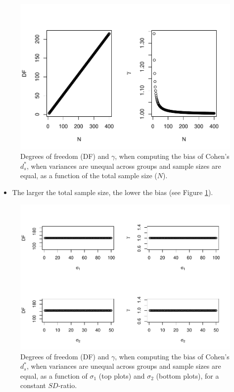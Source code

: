 \documentclass[
  english,
  man,mask]{apa6}
\providecommand{\tightlist}{%
  \setlength{\itemsep}{0pt}\setlength{\parskip}{0pt}}
\begin{document}
\begin{figure}
\centering
\includegraphics{Theoretical-Bias-of-all-estimators-as-a-function-of-population-parameters_files/figure-latex/biascohendprimehetbalNsize2-1.pdf}
\caption{\label{fig:biascohendprimehetbalNsize2}Degrees of freedom (DF) and \(\gamma\), when computing the bias of Cohen's \(d^*_s\), when variances are unequal across groups and sample sizes are equal, as a function of the total sample size (\(N\)).}
\end{figure}

\begin{itemize}
\tightlist
\item
  The larger the total sample size, the lower the bias (see Figure \ref{fig:biascohendprimehetbalNsize2}).
\end{itemize}

\begin{figure}
\centering
\includegraphics{Theoretical-Bias-of-all-estimators-as-a-function-of-population-parameters_files/figure-latex/biascohendprimehetbalvariance2-1.pdf}
\caption{\label{fig:biascohendprimehetbalvariance2}Degrees of freedom (DF) and \(\gamma\), when computing the bias of Cohen's \(d^*_s\), when variances are unequal across groups and sample sizes are equal, as a function of \(\sigma_1\) (top plots) and \(\sigma_2\) (bottom plots), for a constant \(SD\)-ratio.}
\end{figure}
\end{document}
